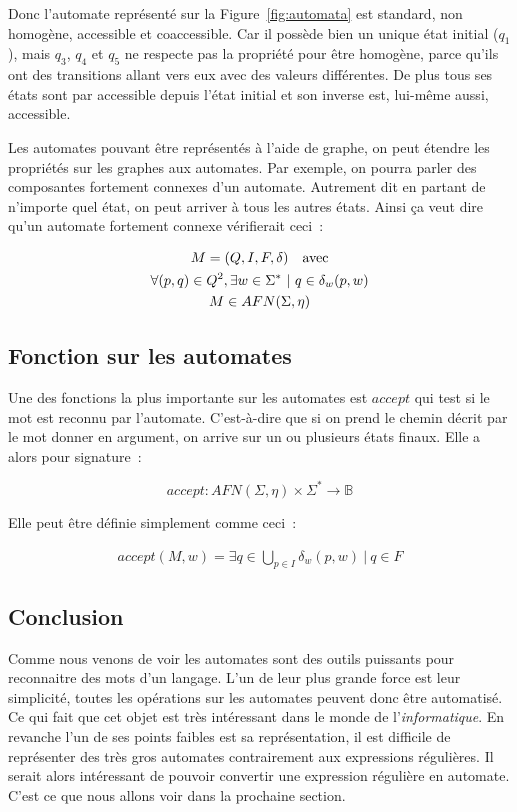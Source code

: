 \vphantom{}

Donc l'automate représenté sur la Figure~\ref{fig:automata} est standard, non
homogène, accessible et coaccessible. Car il possède bien un unique état
initial (\(q_1\)), mais \(q_3\), \(q_4\) et \(q_5\) ne respecte pas la
propriété pour être homogène, parce qu'ils ont des transitions allant vers eux
avec des valeurs différentes. De plus tous ses états sont par accessible depuis
l'état initial et son inverse est, lui-même aussi, accessible.

\vphantom{}

Les automates pouvant être représentés à l'aide de graphe, on peut étendre les
propriétés sur les graphes aux automates. Par exemple, on pourra parler des
composantes fortement connexes d'un automate. Autrement dit en partant de
n'importe quel état, on peut arriver à tous les autres états. Ainsi ça veut
dire qu'un automate fortement connexe vérifierait ceci~:

\begin{gather*}
    M = (Q, I, F, \delta) \quad \text{avec} \\
    \forall (p, q) \in Q^2, \exists w \in \Sigma^* ~|~ q \in \delta_w(p, w) \notag \\
    M \in AFN(\Sigma, \eta) \notag
\end{gather*}

\subsection{Fonction sur les automates}

Une des fonctions la plus importante sur les automates est \(accept\) qui test
si le mot est reconnu par l'automate. C'est-à-dire que si on prend le chemin
décrit par le mot donner en argument, on arrive sur un ou plusieurs états
finaux. Elle a alors pour signature~:

\[
    accept: AFN(\Sigma, \eta) \times \Sigma^* \to \mathbb{B}
\]

Elle peut être définie simplement comme ceci~:

\begin{align*}
    accept(M, w) = \exists q \in \bigcup_{p \in I} \delta_w(p, w) ~|~ q \in F
\end{align*}

\subsection{Conclusion}

Comme nous venons de voir les automates sont des outils puissants pour
reconnaitre des mots d'un langage. L'un de leur plus grande force est leur
simplicité, toutes les opérations sur les automates peuvent donc être
automatisé. Ce qui fait que cet objet est très intéressant dans le monde de
l'\textit{informatique}. En revanche l'un de ses points faibles est sa
représentation, il est difficile de représenter des très gros automates
contrairement aux expressions régulières. Il serait alors intéressant de
pouvoir convertir une expression régulière en automate. C'est ce que nous
allons voir dans la prochaine section.
